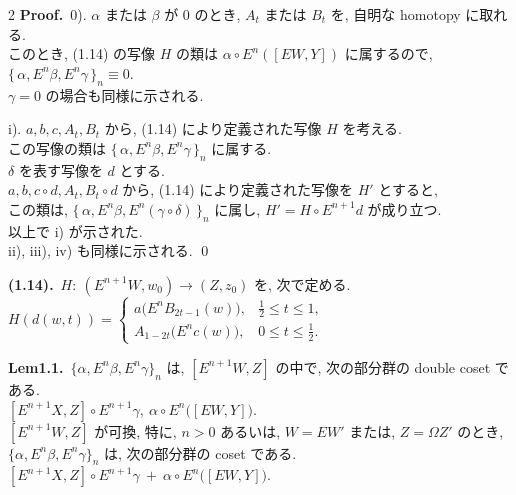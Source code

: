 \documentclass[10pt, leqno]{ltjsarticle}
\newcommand{\Ex}{E}        %
\newcommand{\todai}[2][]{\{\,#2\,\}_{#1}}      %
\numberwithin{equation}{section}
\theoremstyle{plain}
\theoremstyle{definition}
\theoremstyle{remark}
\begin{document}
\begin{paracol}{2}
\noindent
\textbf{Proof.}\ 
0). $\alpha$ または $\beta$ が $0$ のとき, 
$A_t$ または $B_t$ を,
自明な homotopy に取れる. \\
このとき, (1.14) の写像 \(H\) の類は 
\(\alpha\circ E^n([EW,Y])\) に属するので,
\(\todai[n]{\alpha, E^n\beta, E^n\gamma}\equiv0\).\\
\(\gamma=0\) の場合も同様に示される.

i). 
\(a,b,c,A_t,B_t\) から, (1.14) により定義された写像 \(H\)
を考える.\\
この写像の類は 
\(\todai[n]{\alpha, E^n\beta, E^n\gamma}\)
に属する.\\
\(\delta\) を表す写像を \(d\) とする.\\
\(a,b,c\circ d, A_t, B_t\circ d\) から, (1.14) により定義された写像を \(H'\)
とすると,\\
この類は, \(\todai[n]{\alpha, E^n\beta, E^n(\gamma\circ\delta)}\)
に属し, 
\(H'=H\circ E^{n+1}d\) が成り立つ.\\
以上で i) が示された.\\
ii), iii), iv) も同様に示される.
\qed

\switchcolumn

\noindent
\textbf{(1.14).}\ $H:\ (\Ex^{n+1}W,w_0)\to (Z,z_0)$ を, 次で定める. \\
\(
H(d(w,t))=
\begin{cases}
a\bigl(\Ex^n B_{2t-1}(w)\bigr), & \tfrac12\le t\le 1,\\[2mm]
A_{1-2t}\bigl(\Ex^n c(w)\bigr), & 0\le t\le \tfrac12.
\end{cases}
\)

\noindent
\textbf{Lem1.1.}\ 
$\{\alpha,\Ex^n\beta,\Ex^n\gamma\}_n$ は,
$[\Ex^{n+1}W, Z]$ の中で,
次の部分群の double coset である.\\
\([\Ex^{n+1}X, Z]\circ \Ex^{n+1}\gamma, \
\alpha\circ \Ex^n\!\bigl([\Ex W, Y]\bigr).\)\\
$[\Ex^{n+1}W, Z]$ が可換,
特に, $n>0$ あるいは, $W=\Ex W'$ または, $Z=\Omega Z'$ のとき, \\
\(\{\alpha,\Ex^n\beta,\Ex^n\gamma\}_n\)
は, 次の部分群の coset である.\\
\([\Ex^{n+1}X, Z]\circ \Ex^{n+1}\gamma \ +\ 
\alpha\circ \Ex^n\!\bigl([\Ex W, Y]\bigr).\)


\end{paracol}
\end{document}
